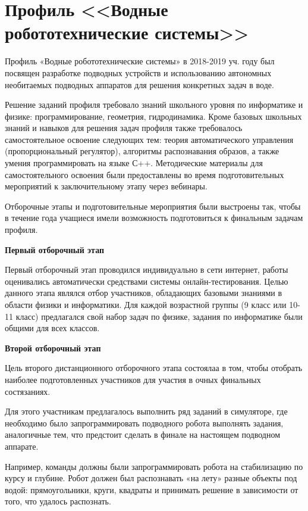 

\section*{Профиль <<Водные робототехнические системы>>}

Профиль «Водные робототехнические системы» в 2018-2019 уч. году был посвящен разработке подводных устройств и использованию автономных необитаемых подводных аппаратов для решения конкретных задач в воде. 

Решение заданий профиля требовало знаний школьного уровня по информатике и физике: программирование, геометрия, гидродинамика. Кроме базовых школьных знаний и навыков для решения задач профиля также требовалось самостоятельное освоение следующих тем: теория автоматического управления (пропорциональный регулятор), алгоритмы распознавания образов, а также умения программировать на языке С++. Методические материалы для самостоятельного освоения были предоставлены во время подготовительных мероприятий к заключительному этапу через вебинары.

Отборочные этапы и подготовительные мероприятия были выстроены так, чтобы в течение года учащиеся имели возможность подготовиться к финальным задачам профиля.

\textbf{Первый отборочный этап}

Первый отборочный этап проводился индивидуально в сети интернет, работы оценивались автоматически средствами системы онлайн-тестирования. Целью данного этапа являлся отбор участников, обладающих базовыми знаниями в области физики и информатики.  Для каждой возрастной группы (9 класс или 10-11 класс) предлагался свой набор задач по физике, задания по информатике были общими для всех классов. 

\textbf{Второй отборочный этап}

Цель второго дистанционного отборочного этапа состоялаа в том, чтобы отобрать наиболее подготовленных участников для участия в очных финальных состязаниях. 

Для этого участникам предлагалось выполнить ряд заданий в симуляторе, где необходимо было запрограммировать подводного робота выполнять задания, аналогичные тем, что предстоит сделать в финале на настоящем подводном аппарате. 

Например, команды должны были запрограммировать робота на стабилизацию по курсу и глубине. Робот должен был распознавать «на лету» разные объекты под водой: прямоугольники, круги, квадраты и принимать решение в зависимости от того, что удалось распознать.

